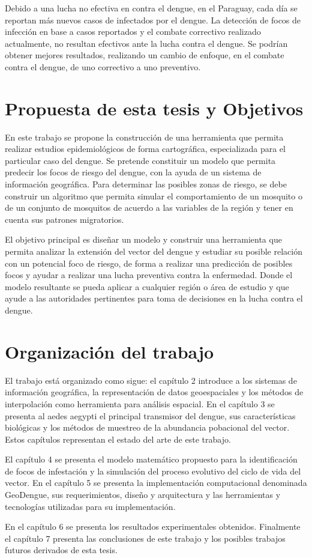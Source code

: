 Debido a una lucha no efectiva en contra el dengue, en  el Paraguay, cada día se reportan más
nuevos casos de infectados por el dengue. La detección de focos de infección en base a casos
reportados y el combate correctivo realizado actualmente, no resultan efectivos ante la lucha
contra el dengue. Se podrían obtener mejores resultados, realizando un cambio de enfoque, en el
combate contra el dengue, de uno correctivo a uno preventivo.

\section{Propuesta de esta tesis y Objetivos}
En este trabajo se propone la construcción de una herramienta que permita realizar estudios
epidemiológicos de forma cartográfica, especializada para el particular caso del dengue. Se
pretende constituir un modelo que permita predecir los focos de riesgo del dengue, con la ayuda de
un sistema de información geográfica. Para determinar las posibles zonas de riesgo, se debe
construir un algoritmo que permita simular el comportamiento de un mosquito o de un conjunto de
mosquitos de acuerdo a las variables de la región y tener en cuenta sus patrones migratorios.

El objetivo principal es diseñar un modelo y construir una herramienta que permita analizar la
extensión del vector del dengue y estudiar su posible relación con un potencial foco de riesgo, de
forma a realizar una predicción de posibles focos y ayudar a realizar una lucha preventiva contra
la enfermedad. Donde el modelo resultante se pueda aplicar a cualquier región o área de estudio y
que ayude a las autoridades pertinentes para toma de decisiones en la lucha contra el dengue.

\section{Organización del trabajo}
El trabajo está organizado como sigue: el capítulo 2 introduce a los sistemas de información
geográfica, la representación de datos geoespaciales y los métodos de interpolación como
herramienta para análisis espacial. En el capítulo 3 se presenta al aedes aegypti el principal
transmisor del dengue, sus características biológicas y los métodos de muestreo de la abundancia
pobacional del vector. Estos capítulos representan el estado del arte de este trabajo.

El capítulo 4 se presenta el modelo matemático propuesto para la identificación de focos de
infestación y la simulación del proceso evolutivo del ciclo de vida del vector. En el capítulo 5
se presenta la implementación computacional denominada GeoDengue, sus requerimientos, diseño y
arquitectura y las herramientas y tecnologías utilizadas para su implementación.

En el capítulo 6 se presenta los resultados experimentales obtenidos. Finalmente el capítulo 7
presenta las conclusiones de este trabajo y los  posibles trabajos futuros derivados de esta tesis.
